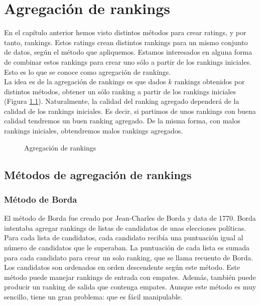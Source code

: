 \chapter{Agregación de rankings}

En el capítulo anterior hemos visto distintos métodos para crear ratings, y por tanto, rankings. Estos ratings crean distintos rankings para un mismo conjunto de datos, según el método que apliquemos. Estamos interesados en alguna forma de combinar estos rankings para crear uno sólo a partir de los rankings iniciales. Esto es lo que se conoce como agregación de rankings. \\

La idea es de la agregación de rankings es que dados $k$ rankings obtenidos por distintos métodos, obtener un sólo ranking a partir de los rankings iniciales (Figura \ref{fig:agregacion_rankings}). Naturalmente, la calidad del ranking agregado dependerá de la calidad de los rankings iniciales. Es decir, si partimos de unos rankings con buena calidad tendremos un buen ranking agregado. De la misma forma, con malos rankings iniciales, obtendremos malos rankings agregados. 

\begin{figure}[htb]
\centering
\agregacionrankings
\caption{Agregación de rankings}
\label{fig:agregacion_rankings}
\end{figure}

\section{Métodos de agregación de rankings}
\subsection{Método de Borda}
El método de Borda fue creado por Jean-Charles de Borda y data de 1770. Borda intentaba agregar rankings de listas de candidatos de unas elecciones políticas. Para cada lista de candidatos, cada candidato recibía una puntuación igual al número de candidatos que le superaban. La puntuación de cada lista es sumada para cada candidato para crear un solo ranking, que se llama recuento de Borda. Los candidatos son ordenados en orden descendente según este método. Este método puede manejar rankings de entrada con empates. Además, también puede producir un ranking de salida que contenga empates.  Aunque este método es muy sencillo, tiene un gran problema: que es fácil manipulable.


